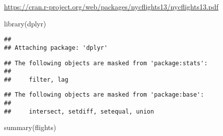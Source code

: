 \documentclass[
]{article}
\newenvironment{Shaded}{\begin{snugshade}}{\end{snugshade}}
\newcommand{\FunctionTok}[1]{\textcolor[rgb]{0.00,0.00,0.00}{#1}}
\newcommand{\NormalTok}[1]{#1}
\begin{document}
\url{https://cran.r-project.org/web/packages/nycflights13/nycflights13.pdf}

\begin{Shaded}
\begin{Highlighting}[]
\FunctionTok{library}\NormalTok{(dplyr)}
\end{Highlighting}
\end{Shaded}

\begin{verbatim}
## 
## Attaching package: 'dplyr'
\end{verbatim}

\begin{verbatim}
## The following objects are masked from 'package:stats':
## 
##     filter, lag
\end{verbatim}

\begin{verbatim}
## The following objects are masked from 'package:base':
## 
##     intersect, setdiff, setequal, union
\end{verbatim}

\begin{Shaded}
\begin{Highlighting}[]
\FunctionTok{summary}\NormalTok{(flights)}
\end{Highlighting}
\end{Shaded}
\end{document}
